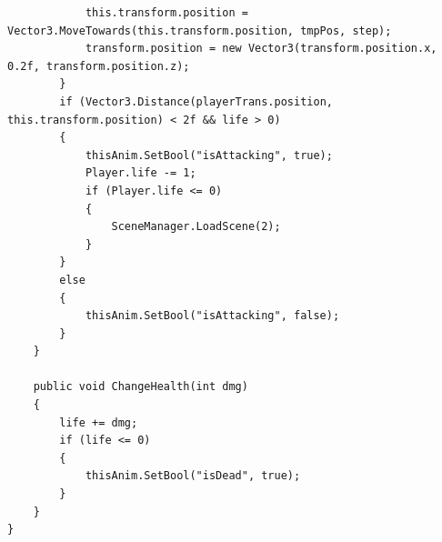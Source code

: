 \documentclass[12pt,a4paper]{article}
\begin{document}
\begin{itemize}
\begin{verbatim}
            this.transform.position = Vector3.MoveTowards(this.transform.position, tmpPos, step);
            transform.position = new Vector3(transform.position.x, 0.2f, transform.position.z);
        }
        if (Vector3.Distance(playerTrans.position, this.transform.position) < 2f && life > 0)
        {
            thisAnim.SetBool("isAttacking", true);
            Player.life -= 1;
            if (Player.life <= 0)
            {
                SceneManager.LoadScene(2);
            }
        }
        else
        {
            thisAnim.SetBool("isAttacking", false);
        }
    }

    public void ChangeHealth(int dmg)
    {
        life += dmg;
        if (life <= 0)
        {
            thisAnim.SetBool("isDead", true);
        }
    }
}

	\end{verbatim}
	\end{itemize}
\end{document}
